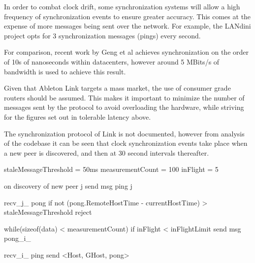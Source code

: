 \documentclass[11pt]{article} %
\theoremstyle{plain}
\theoremstyle{definition}
\begin{document}
In order to combat clock drift, some synchronization systems will allow a high
frequency of synchronization events to ensure greater accuracy. This comes at
the expense of more messages being sent over the network. For example, the
LANdini project opts for 3 synchronization messages (pings) every second.

For comparison, recent work by Geng et al\cite{geng2018} achieves
synchronization on the order of 10s of nanoseconds within datacenters, however
around 5 MBits/s of bandwidth is used to achieve this result.

Given that Ableton Link targets a mass market, the use of consumer grade
routers should be assumed. This makes it important to minimize the number of
messages sent by the protocol to avoid overloading the hardware, while striving
for the figures set out in tolerable latency above.

The synchronization protocol of Link is not documented, however from analysis
of the codebase it can be seen that clock synchronization events take place
when a new peer is discovered, and then at 30 second intervals thereafter.


  staleMessageThreshold = 50ms
  measurementCount = 100
  inFlight = 5

  on discovery of new peer j
    send msg ping j

  recv_j_ pong
    if not (pong.RemoteHostTime - currentHostTime) >  staleMessageThreshold
      reject

    while(sizeof(data) < measurementCount)
      if inFlight < inFlightLimit
      send msg pong_i_

  recv_i_ ping
    send <Host, GHost, pong>


\end{document}

